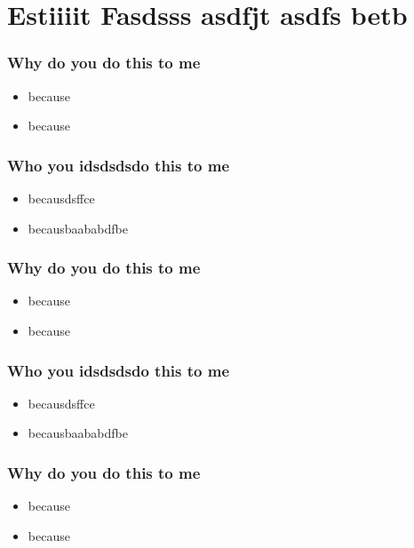 \documentclass{beamer}
\begin{document}
    \section{Estiiiit Fasdsss asdfjt asdfs betb}
        \begin{frame}
            \frametitle{Why do you do this to me}
            \begin{itemize}
                \item because
                \item because
            \end{itemize}
        \end{frame}
        \begin{frame}
            \frametitle{Who you idsdsdsdo this to me}
            \begin{itemize}
                \item becausdsffce
                \item becausbaababdfbe
            \end{itemize}
        \end{frame}
        \begin{frame}
            \frametitle{Why do you do this to me}
            \begin{itemize}
                \item because
                \item because
            \end{itemize}
        \end{frame}
        \begin{frame}
            \frametitle{Who you idsdsdsdo this to me}
            \begin{itemize}
                \item becausdsffce
                \item becausbaababdfbe
            \end{itemize}
        \end{frame}
        \begin{frame}
            \frametitle{Why do you do this to me}
            \begin{itemize}
                \item because
                \item because
            \end{itemize}
        \end{frame}
\end{document}
